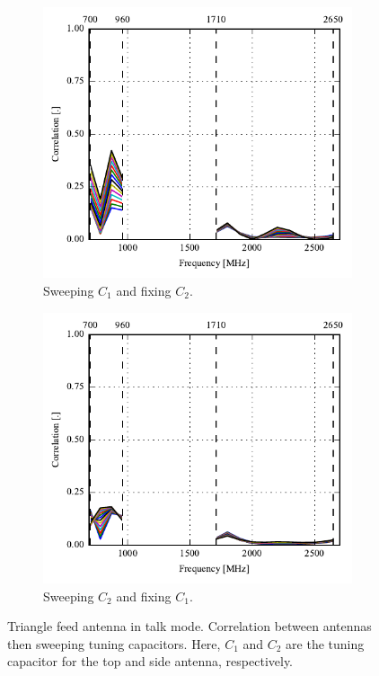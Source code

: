 \begin{figure}[htbp]
    \centering
    \begin{subfigure}{0.49\linewidth}
        \includegraphics{img/tech_sol/trianglefeed/talk_mode/correlation_Csh1-sweep}
        \caption{Sweeping $C_1$ and fixing $C_2$.}
    \end{subfigure}
    \hfill
    \begin{subfigure}{0.49\linewidth}
        \includegraphics{img/tech_sol/trianglefeed/talk_mode/correlation_Csh2-sweep}
        \caption{Sweeping $C_2$ and fixing $C_1$.}
    \end{subfigure}
    \caption{Triangle feed antenna in talk mode. Correlation between antennas then sweeping tuning capacitors. Here, $C_1$ and $C_2$ are the tuning capacitor for the top and side antenna, respectively.}
    \label{fig:corr_sol2_talk}
\end{figure}

